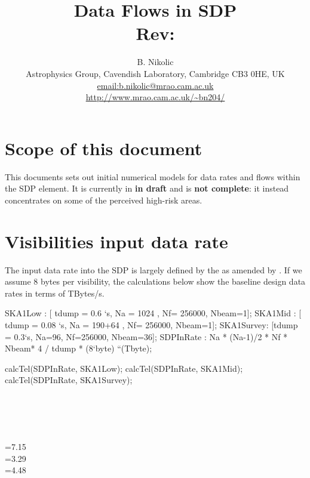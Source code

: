 \documentclass[useAMS,usenatbib,referee]{article}
\title{Data Flows in SDP\\
  Rev: }
\author{B. Nikolic\\
  Astrophysics Group, Cavendish Laboratory, Cambridge CB3 0HE, UK
  \\\url{email:b.nikolic@mrao.cam.ac.uk}
 \\\url{http://www.mrao.cam.ac.uk/~bn204/}}
\begin{document}
\maketitle

\tableofcontents

\section{Scope of this document}

This documents sets out initial numerical models for data rates and
flows within the SDP element. It is currently in {\bf in draft} and is
{\bf not complete}: it instead concentrates on some of the perceived
high-risk areas. 

\section{Visibilities input data rate}

The input data rate into the SDP is largely defined by the
\cite{DewdneyDD001-1} as amended by \cite{McCoolDD003}.  If we assume
8 bytes per visibility, the calculations below show the baseline
design data rates in terms of TBytes/s. 

\begin{maxima}
SKA1Low : [ tdump = 0.6 `s, Na = 1024 , Nf= 256000, Nbeam=1];
SKA1Mid : [ tdump = 0.08 `s, Na = 190+64 , Nf= 256000, Nbeam=1];
SKA1Survey: [tdump = 0.3`s, Na=96, Nf=256000, Nbeam=36];
SDPInRate : Na * (Na-1)/2 * Nf * Nbeam* 4 / tdump * (8`byte) ``(Tbyte);

calcTel(SDPInRate, SKA1Low);
calcTel(SDPInRate, SKA1Mid);
calcTel(SDPInRate, SKA1Survey);

\maximaoutput*
\m  \left[ \mathrm{tdump}=0.6\;\mathrm{s} , N_{\rm a}=1024 , N_{\rm f}=256000 , N_{\rm beam}=1 \right] \\
\m  \left[ \mathrm{tdump}=0.08\;\mathrm{s} , N_{\rm a}=254 , N_{\rm f}=256000 , N_{\rm beam}=1 \right] \\
\m  \left[ \mathrm{tdump}=0.3\;\mathrm{s} , N_{\rm a}=96 , N_{\rm f}=256000 , N_{\rm beam}=36 \right] \\
\; \\
\m  {}=7.15 \\
\m  {}=3.29 \\
\m  {}=4.48 \\
\end{maxima}
\end{document}
